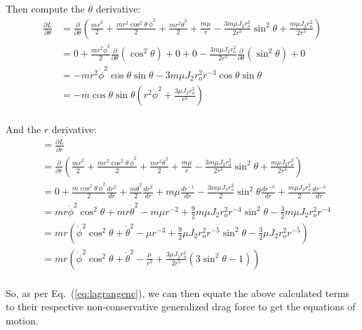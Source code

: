 \documentclass[titlepage]{article}
\begin{document}
Then compute the $\theta$ derivative:
\begin{equation}
	\begin{split}
		\frac{\partial L}{\partial\theta}&=\frac{\partial}{\partial\theta}\left(\frac{m\dot{r}^2}{2}+\frac{mr^2\cos^2\theta\,\dot{\phi}^2}{2}+\frac{mr^2\dot{\theta}^2}{2}+\frac{m\mu}{r}-\frac{3m\mu J_2r_o^2}{2r^3}\sin^2\theta+\frac{m\mu J_2r_o^2}{2r^3}\right) \\
		&=0+\frac{mr^2\dot{\phi}^2}{2}\frac{\partial}{\partial\theta}\left(\cos^2\theta\right)+0+0-\frac{3m\mu J_2r_o^2}{2r^3}\frac{\partial}{\partial\theta}\left(\sin^2\theta\right)+0 \\
		&=-mr^2\dot{\phi}^2\cos\theta\sin\theta-3m\mu J_2r_o^2r^{-3}\cos\theta\sin\theta \\
		&=-m\cos\theta\sin\theta\left(r^2\dot{\phi}^2+\frac{3\mu J_2r_o^2}{r^3}\right) \\
	\end{split}
\end{equation}

And the $r$ derivative:
\begin{equation}
	\begin{split}
		&=\frac{\partial L}{\partial r} \\
		&=\frac{\partial}{\partial r}\left(\frac{m\dot{r}^2}{2}+\frac{mr^2\cos^2\theta\,\dot{\phi}^2}{2}+\frac{mr^2\dot{\theta}^2}{2}+\frac{m\mu}{r}-\frac{3m\mu J_2r_o^2}{2r^3}\sin^2\theta+\frac{m\mu J_2r_o^2}{2r^3}\right) \\
		&=0+\frac{m\cos^2\theta\,\dot{\phi}^2}{2}\frac{dr^2}{dr}+\frac{m\dot{\theta}^2}{2}\frac{dr^2}{dr}+m\mu\frac{dr^{-1}}{dr}-\frac{3m\mu J_2r_o^2}{2}\sin^2\theta\frac{dr^{-3}}{dr}+\frac{m\mu J_2r_o^2}{2}\frac{dr^{-3}}{dr} \\
		&=mr\dot{\phi}^2\cos^2\theta+mr\dot{\theta}^2-m\mu r^{-2}+\frac{9}{2}m\mu J_2r_o^2r^{-4}\sin^2\theta-\frac{3}{2}m\mu J_2r_o^2r^{-4} \\
		&=mr\left(\dot{\phi}^2\cos^2\theta+\dot{\theta}^2-\mu r^{-3}+\frac{9}{2}\mu J_2r_o^2r^{-5}\sin^2\theta-\frac{3}{2}\mu J_2r_o^2r^{-5}\right) \\
		&=mr\left(\dot{\phi}^2\cos^2\theta+\dot{\theta}^2-\frac{\mu}{r^3}+\frac{3\mu J_2r_o^2}{2r^5}\left(3\sin^2\theta-1\right)\right) \\
	\end{split}
\end{equation}

So, as per Eq.~(\ref{eq:lagrangenc}), we can then equate the above calculated terms to their respective non-conservative generalized drag force to get the equations of motion.\\
\end{document}
